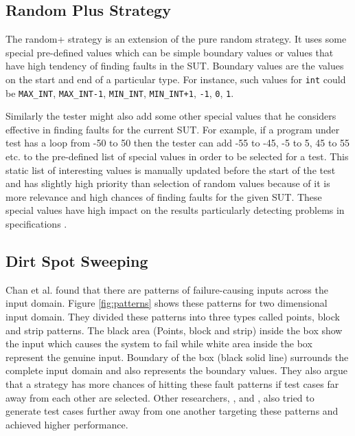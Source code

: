 \documentclass[conference]{IEEEtran}
\begin{document}
\subsection{Random Plus Strategy}
The random+ strategy \cite{Leitner2007} is an extension of the pure random strategy. It uses some special pre-defined values which can be simple boundary values or values that have high tendency of finding faults in the SUT. Boundary values \cite{Beizer1990} are the values on the start and end of a particular type. For instance, such values for \verb+int+ could be \verb+MAX_INT+, \verb+MAX_INT-1+, \verb+MIN_INT+, \verb-MIN_INT+1-, \verb+-1+, \verb+0+, \verb+1+.


%

Similarly the tester might also add some other special values that he considers effective in finding faults for the current SUT. For example, if a program under test has a loop from -50 to 50 then the tester can add -55 to -45, -5 to 5, 45 to 55 etc. to the pre-defined list of special values in order to be selected for a test. This static list of interesting values is manually updated before the start of the test and has slightly high priority than selection of random values because of it is more relevance and high chances of finding faults for the given SUT. These special values have high impact on the results particularly detecting problems in specifications \cite{Ciupa2008}.


\subsection{Dirt Spot Sweeping}
Chan et al. \cite{Chan1996} found that there are patterns of failure-causing inputs across the input domain. Figure \ref{fig:patterns} shows these patterns for two dimensional input domain. They divided these patterns into three types called points, block and strip patterns. The black area (Points, block and strip) inside the box show the input which causes the system to fail while white area inside the box represent the genuine input. Boundary of the box (black solid line) surrounds the complete input domain and also represents the boundary values. They also argue that a strategy has more chances of hitting these fault patterns if test cases far away from each other are selected. Other researchers, \cite{Chan2002}, \cite{Chen2003} and \cite{Chen2005}, also tried to generate test cases further away from one another targeting these patterns and achieved higher performance.
\end{document}
